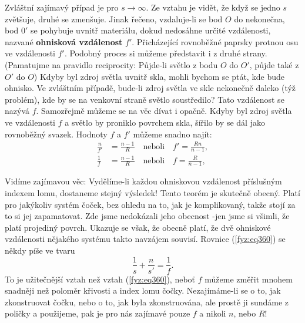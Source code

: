     Zvláštní zajímavý případ je pro \(s\rightarrow\infty\). Ze vztahu je vidět, že když se jedno 
    \(s\) zvětšuje, druhé se zmenšuje. Jinak řečeno, vzdaluje-li se bod \(O\) do nekonečna, bod 
    \(0'\) se pohybuje uvnitř materiálu, dokud nedosáhne určité vzdálenosti, nazvané 
    \textbf{ohnisková vzdálenost} \(f'\). Přicházející rovnoběžné paprsky protnou osu ve 
    vzdálenosti \(f'\). Podobný proces si můžeme představit i z druhé strany. (Pamatujme na 
    pravidlo reciprocity: Půjde-li světlo z bodu \(O\) do \(O'\), půjde také z \(O'\) do \(O\)) 
    Kdyby byl zdroj světla uvnitř skla, mohli bychom se ptát, kde bude ohnisko. Ve zvláštním 
    případě, bude-li zdroj světla ve skle nekonečně daleko (týž problém), kde by se na venkovní 
    straně světlo soustředilo? Tato vzdálenost se nazývá \(f\). Samozřejmě můžeme se na věc dívat i 
    opačně. Kdyby byl zdroj světla ve vzdálenosti \(f\) a světlo by proniklo povrchem skla, šířilo 
    by se dál jako rovnoběžný svazek. Hodnoty \(f\) a \(f'\) můžeme snadno najít:
    \begin{subequations}\label{fyz:eq361}
      \begin{align}
        \frac{n}{f'}&=\frac{n-1}{R} \quad\text{neboli}\quad f'=\frac{Rn}{n-1}, \label{fyz:eq361a} \\
        \frac{1}{f} &=\frac{n-1}{R} \quad\text{neboli}\quad f=\frac{R}{n-1}, \label{fyz:eq361b} 
      \end{align}
    \end{subequations}

    Vidíme zajímavou věc: Vydělíme-li každou ohniskovou vzdálenost příslušným indexem lomu, 
    dostaneme stejný výsledek! Tento teorém je skutečně obecný. Platí pro jakýkoliv systém čoček, 
    bez ohledu na to, jak je komplikovaný, takže stojí za to si jej zapamatovat. Zde jsme 
    nedokázali jeho obecnost -jen jsme si všimli, že platí projediný povrch. Ukazuje se však, že 
    obecně platí, že dvě ohniskové vzdálenosti nějakého systému takto navzájem souvisí. Rovnice 
    (\ref{fyz:eq360}) se někdy píše ve tvaru
    \begin{equation}\label{fyz:eq362}
        \frac{1}{s} + \frac{n}{s'} = \frac{1}{f}.
    \end{equation}
    To je užitečnější vztah než vztah (\ref{fyz:eq360}), neboť \(f\) můžeme změřit mnohem snadněji 
    než poloměr křivosti a index lomu čočky. Nezajímáme-li se o to, jak zkonstruovat čočku, nebo o 
    to, jak byla zkonstruována, ale prostě ji sundáme z poličky a použijeme, pak je pro nás 
    zajímavé pouze \(f\) a nikoli \(n\), nebo \(R\)!

